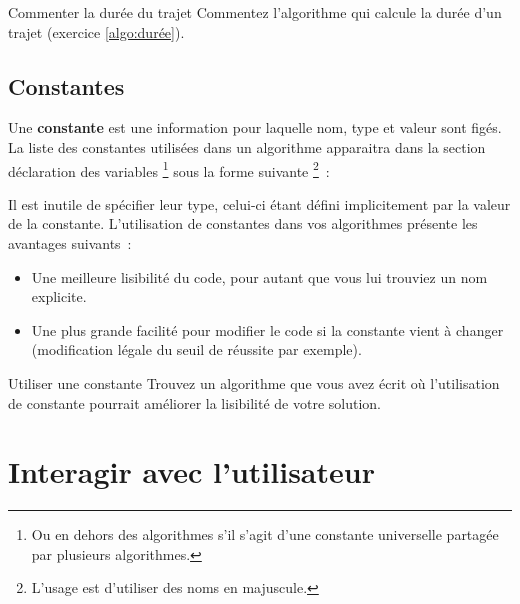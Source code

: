 			\begin{Exercice}{Commenter la durée du trajet}
				Commentez l’algorithme qui calcule la durée d’un trajet
				(exercice \vref{algo:durée}).
			\end{Exercice}
			
		\subsection{Constantes}
	
			Une \textbf{constante} est une information pour laquelle nom, type et
			valeur sont figés. La liste des constantes utilisées dans un algorithme
			apparaitra dans la section déclaration des variables%
			\footnote{%
				Ou en dehors des algorithmes s’il s’agit d’une
				constante universelle partagée par plusieurs algorithmes.%
			} 
			sous la forme suivante%
			\footnote{%
				L’usage est d’utiliser des noms en majuscule.%
			}~:
	
			\begin{LDA}
			\end{LDA}
	
			Il est inutile de spécifier leur type, celui-ci
			étant défini implicitement par la valeur de la constante.	
			L’utilisation de constantes dans vos algorithmes présente
			les avantages suivants~:
			\begin{itemize}
			\item
				Une meilleure lisibilité du code,
				pour autant que vous lui trouviez un nom explicite.
			\item
				Une plus grande facilité pour modifier le code
				si la constante vient à changer 
				(modification légale du seuil de réussite par exemple).
			\end{itemize}
			
			\begin{Exercice}{Utiliser une constante}
				Trouvez un algorithme que vous avez écrit
				où l’utilisation de constante
				pourrait améliorer la lisibilité de votre solution.
			\end{Exercice}
			
	\section{Interagir avec l’utilisateur}
	
